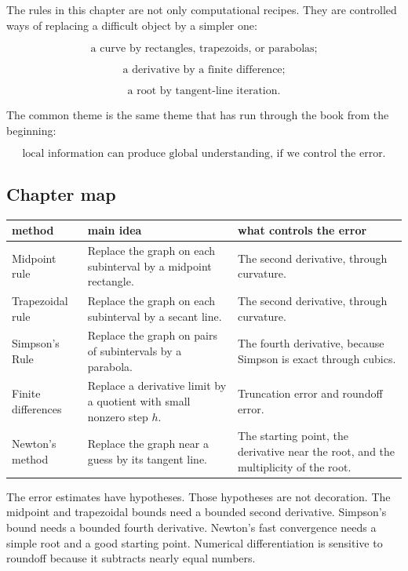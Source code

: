The rules in this chapter are not only computational recipes.  They are controlled
ways of replacing a difficult object by a simpler one:

\[
\text{a curve by rectangles, trapezoids, or parabolas;}
\]

\[
\text{a derivative by a finite difference;}
\]

\[
\text{a root by tangent-line iteration.}
\]

The common theme is the same theme that has run through the book from the
beginning:

\[
\text{local information can produce global understanding, if we control the error.}
\]

\subsection{Chapter map}
\label{subsec:chapter-12-map}

\begin{center}
\renewcommand{\arraystretch}{1.35}
\begin{tabular}{p{}|p{}|p{}}
\textbf{method} & \textbf{main idea} & \textbf{what controls the error} \\ \hline
Midpoint rule & Replace the graph on each subinterval by a midpoint rectangle. & The second derivative, through curvature. \\ \hline
Trapezoidal rule & Replace the graph on each subinterval by a secant line. & The second derivative, through curvature. \\ \hline
Simpson's Rule & Replace the graph on pairs of subintervals by a parabola. & The fourth derivative, because Simpson is exact through cubics. \\ \hline
Finite differences & Replace a derivative limit by a quotient with small nonzero step \(h\). & Truncation error and roundoff error. \\ \hline
Newton's method & Replace the graph near a guess by its tangent line. & The starting point, the derivative near the root, and the multiplicity of the root.
\end{tabular}
\end{center}

The error estimates have hypotheses.  Those hypotheses are not decoration.  The
midpoint and trapezoidal bounds need a bounded second derivative.  Simpson's bound
needs a bounded fourth derivative.  Newton's fast convergence needs a simple root and
a good starting point.  Numerical differentiation is sensitive to roundoff because it
subtracts nearly equal numbers.

